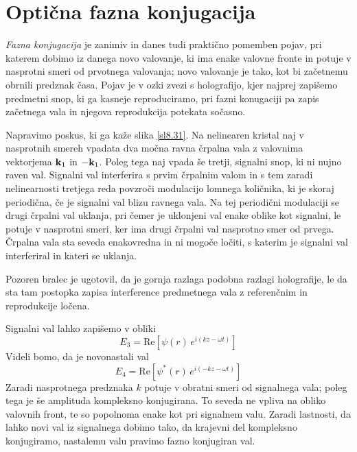 \section{Optična fazna konjugacija}

\textit{Fazna konjugacija} je zanimiv in danes tudi praktično pomemben
pojav, pri katerem dobimo iz danega novo valovanje, ki ima enake valovne
fronte in potuje v nasprotni smeri od prvotnega valovanja; novo valovanje
je tako, kot bi začetnemu obrnili predznak časa. Pojav je v ozki zvezi
s holografijo, kjer najprej zapišemo predmetni snop, ki ga kasneje
reproduciramo, pri fazni konugaciji pa zapis začetnega vala in njegova
reprodukcija potekata sočasno.

Napravimo poskus, ki ga kaže slika \ref{sl8.31}. Na nelinearen kristal
naj v nasprotnih smereh vpadata dva močna ravna črpalna vala z valovnima
vektorjema ${\bf k}_{1}$ in $-{\bf k}_{1}$. Poleg tega naj vpada
še tretji, signalni snop, ki ni nujno raven val. Signalni val interferira
s prvim črpalnim valom in s tem zaradi nelinearnosti tretjega reda
povzroči modulacijo lomnega količnika, ki je skoraj periodična, če
je signalni val blizu ravnega vala. Na tej periodični modulaciji se
drugi črpalni val uklanja, pri čemer je uklonjeni val enake oblike
kot signalni, le potuje v nasprotni smeri, ker ima drugi črpalni val
nasprotno smer od prvega. Črpalna vala sta seveda enakovredna in ni
mogoče ločiti, s katerim je signalni val interferiral in kateri se
uklanja.

Pozoren bralec je ugotovil, da je gornja razlaga podobna razlagi holografije,
le da sta tam postopka zapisa interference predmetnega vala z referenčnim
in reprodukcije ločena.

Signalni val lahko zapišemo v obliki 
\begin{equation}
E_{3}=\mathrm{Re}\left[\psi\left(r\right)\, e^{i\left(kz-\omega t\right)}\right]\label{8.97}
\end{equation}
 Videli bomo, da je novonastali val 
\begin{equation}
E_{4}=\mathrm{Re}\left[\psi^{*}\left(r\right)\, e^{i\left(-kz-\omega t\right)}\right]\label{8.98}
\end{equation}
 Zaradi nasprotnega predznaka $k$ potuje v obratni smeri od signalnega
vala; poleg tega je še amplituda kompleksno konjugirana. To seveda
ne vpliva na obliko valovnih front, te so popolnoma enake kot pri signalnem
valu. Zaradi lastnosti, da lahko novi val iz signalnega dobimo tako,
da krajevni del kompleksno konjugiramo, nastalemu valu pravimo fazno
konjugiran val.

